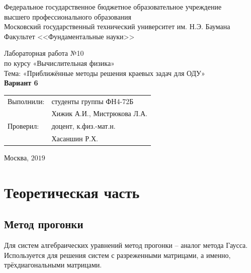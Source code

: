 \documentclass[
11pt,
master, %
subf, %
href, %
colorlinks=true, %
times, %
]{disser}
\begin{document}
\pagestyle{empty}
\begin{center}

\noindent  Федеральное государственное бюджетное образовательное учреждение\\
высшего профессионального образования\\

Московский государственный технический университет им. Н.Э. Баумана \\
Факультет <<Фундаментальные науки>>\bigskip\\

\vfill

Лабораторная работа №10\\
по курсу «Вычислительная физика»\\
Тема: «Приближённые методы решения краевых задач для ОДУ»\\
\textbf{Вариант 6}\\


\vfill
\vfill
\begin{flushright}
\begin{tabular}{ll}
Выполнили: & студенты группы ФН4-72Б     \\
           & Хижик А.И., Мистрюкова Л.А. \\
Проверил:  & доцент, к.физ.-мат.н.       \\
           & Хасаншин Р.Х.
\end{tabular}
\end{flushright}
\vfill
\begin{center}
Москва, $2019$
\end{center}

\end{center}
\pagebreak


\pagestyle{plain}
\tableofcontents

\section{Теоретическая часть}
\subsection{Метод прогонки}
Для систем алгебраических уравнений метод прогонки -- аналог метода Гаусса. Используется для решения систем с разреженными матрицами, а именно, трёхдиагональными матрицами.
\end{document}
